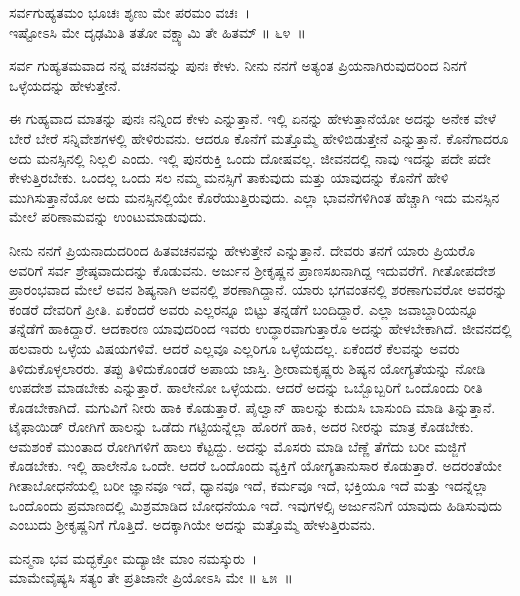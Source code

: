 \begin{shloka}
ಸರ್ವಗುಹ್ಯತಮಂ ಭೂಚಃ ಶೃಣು ಮೇ ಪರಮಂ ವಚಃ~।\\ಇಷ್ಟೋಽಸಿ ಮೇ ದೃಢಮಿತಿ ತತೋ ವಕ್ಷ್ಯಾಮಿ ತೇ ಹಿತಮ್ \hfill॥ ೬೪~॥
\end{shloka}

\begin{artha}
ಸರ್ವ ಗುಹ್ಯತಮವಾದ ನನ್ನ ವಚನವನ್ನು ಪುನಃ ಕೇಳು. ನೀನು ನನಗೆ ಅತ್ಯಂತ ಪ್ರಿಯನಾಗಿರುವುದರಿಂದ ನಿನಗೆ ಒಳ್ಳೆಯದನ್ನು ಹೇಳುತ್ತೇನೆ.
\end{artha}

ಈ ಗುಹ್ಯವಾದ ಮಾತನ್ನು ಪುನಃ ನನ್ನಿಂದ ಕೇಳು ಎನ್ನುತ್ತಾನೆ. ಇಲ್ಲಿ ಏನನ್ನು ಹೇಳುತ್ತಾನೆಯೋ ಅದನ್ನು ಅನೇಕ ವೇಳೆ ಬೇರೆ ಬೇರೆ ಸನ್ನಿವೇಶಗಳಲ್ಲಿ ಹೇಳಿರುವನು. ಆದರೂ ಕೊನೆಗೆ ಮತ್ತೊಮ್ಮೆ ಹೇಳಿಬಿಡುತ್ತೇನೆ ಎನ್ನುತ್ತಾನೆ. ಕೊನೆಗಾದರೂ ಅದು ಮನಸ್ಸಿನಲ್ಲಿ ನಿಲ್ಲಲಿ ಎಂದು. ಇಲ್ಲಿ ಪುನರುಕ್ತಿ ಒಂದು ದೋಷವಲ್ಲ. ಜೀವನದಲ್ಲಿ ನಾವು ಇದನ್ನು ಪದೇ ಪದೇ ಕೇಳುತ್ತಿರಬೇಕು. ಒಂದಲ್ಲ ಒಂದು ಸಲ ನಮ್ಮ ಮನಸ್ಸಿಗೆ ತಾಕುವುದು ಮತ್ತು ಯಾವುದನ್ನು ಕೊನೆಗೆ ಹೇಳಿ ಮುಗಿಸುತ್ತಾನೆಯೋ ಅದು ಮನಸ್ಸಿನಲ್ಲಿಯೇ ಕೊರೆಯುತ್ತಿರುವುದು. ಎಲ್ಲಾ ಭಾವನೆಗಳಿಗಿಂತ ಹೆಚ್ಚಾಗಿ ಇದು ಮನಸ್ಸಿನ ಮೇಲೆ ಪರಿಣಾಮವನ್ನು ಉಂಟುಮಾಡುವುದು.

ನೀನು ನನಗೆ ಪ್ರಿಯನಾದುದರಿಂದ ಹಿತವಚನವನ್ನು ಹೇಳುತ್ತೇನೆ ಎನ್ನುತ್ತಾನೆ. ದೇವರು ತನಗೆ ಯಾರು ಪ್ರಿಯರೊ ಅವರಿಗೆ ಸರ್ವ ಶ್ರೇಷ್ಠವಾದುದನ್ನು ಕೊಡುವನು. ಅರ್ಜುನ ಶ‍್ರೀಕೃಷ್ಣನ ಪ್ರಾಣಸಖನಾಗಿದ್ದ ಇದುವರೆಗೆ. ಗೀತೋಪದೇಶ ಪ್ರಾರಂಭವಾದ ಮೇಲೆ ಅವನ ಶಿಷ್ಯನಾಗಿ ಅವನಲ್ಲಿ ಶರಣಾಗಿದ್ದಾನೆ. ಯಾರು ಭಗವಂತನಲ್ಲಿ ಶರಣಾಗುವರೋ ಅವರನ್ನು ಕಂಡರೆ ದೇವರಿಗೆ ಪ್ರೀತಿ. ಏಕೆಂದರೆ ಅವರು ಎಲ್ಲರನ್ನೂ ಬಿಟ್ಟು ತನ್ನಡೆಗೆ ಬಂದಿದ್ದಾರೆ. ಎಲ್ಲಾ ಜವಾಬ್ದಾರಿಯನ್ನೂ ತನ್ನೆಡೆಗೆ ಹಾಕಿದ್ದಾರೆ. ಆದಕಾರಣ ಯಾವುದರಿಂದ ಇವರು ಉದ್ಧಾರವಾಗುತ್ತಾರೊ ಅದನ್ನು ಹೇಳಬೇಕಾಗಿದೆ. ಜೀವನದಲ್ಲಿ ಹಲವಾರು ಒಳ್ಳೆಯ ವಿಷಯಗಳಿವೆ. ಆದರೆ ಎಲ್ಲವೂ ಎಲ್ಲರಿಗೂ ಒಳ್ಳೆಯದಲ್ಲ. ಏಕೆಂದರೆ ಕೆಲವನ್ನು ಅವರು ತಿಳಿದುಕೊಳ್ಳಲಾರರು. ತಪ್ಪು ತಿಳಿದುಕೊಂಡರೆ ಅಪಾಯ ಜಾಸ್ತಿ. ಶ‍್ರೀರಾಮಕೃಷ್ಣರು ಶಿಷ್ಯನ ಯೋಗ್ಯತೆಯನ್ನು ನೋಡಿ ಉಪದೇಶ ಮಾಡಬೇಕು ಎನ್ನುತ್ತಾರೆ. ಹಾಲೇನೋ ಒಳ್ಳೆಯದು. ಆದರೆ ಅದನ್ನು ಒಬ್ಬೊಬ್ಬರಿಗೆ ಒಂದೊಂದು ರೀತಿ ಕೊಡಬೇಕಾಗಿದೆ. ಮಗುವಿಗೆ ನೀರು ಹಾಕಿ ಕೊಡುತ್ತಾರೆ. ಪೈಲ್ವಾನ್ ಹಾಲನ್ನು ಕುದುಸಿ ಬಾಸುಂದಿ ಮಾಡಿ ತಿನ್ನುತ್ತಾನೆ. ಟೈಫಾಯಿಡ್ ರೋಗಿಗೆ ಹಾಲನ್ನು ಒಡೆದು ಗಟ್ಟಿಯನ್ನೆಲ್ಲಾ ಹೊರಗೆ ಹಾಕಿ, ಅದರ ನೀರನ್ನು ಮಾತ್ರ ಕೊಡಬೇಕು. ಆಮಶಂಕೆ ಮುಂತಾದ ರೋಗಿಗಳಿಗೆ ಹಾಲು ಕೆಟ್ಟದ್ದು. ಅದನ್ನು ಮೊಸರು ಮಾಡಿ ಬೆಣ್ಣೆ ತೆಗೆದು ಬರೀ ಮಜ್ಜಿಗೆ ಕೊಡಬೇಕು. ಇಲ್ಲಿ ಹಾಲೇನೊ ಒಂದೇ. ಆದರೆ ಒಂದೊಂದು ವ್ಯಕ್ತಿಗೆ ಯೋಗ್ಯತಾನುಸಾರ ಕೊಡುತ್ತಾರೆ. ಅದರಂತೆಯೇ ಗೀತಾಬೋಧನೆಯಲ್ಲಿ ಬರೀ ಜ್ಞಾನವೂ ಇದೆ, ಧ್ಯಾನವೂ ಇದೆ, ಕರ್ಮವೂ ಇದೆ, ಭಕ್ತಿಯೂ ಇದೆ ಮತ್ತು ಇದನ್ನೆಲ್ಲಾ ಒಂದೊಂದು ಪ್ರಮಾಣದಲ್ಲಿ ಮಿಶ್ರಮಾಡಿದ ಬೋಧನೆಯೂ ಇದೆ. ಇವುಗಳಲ್ಸಿ ಅರ್ಜುನನಿಗೆ ಯಾವುದು ಹಿಡಿಸುವುದು ಎಂಬುದು ಶ‍್ರೀಕೃಷ್ಣನಿಗೆ ಗೊತ್ತಿದೆ. ಅದಕ್ಕಾಗಿಯೇ ಅದನ್ನು ಮತ್ತೊಮ್ಮೆ ಹೇಳುತ್ತಿರುವನು.

\begin{shloka}
ಮನ್ಮನಾ ಭವ ಮದ್ಭಕ್ತೋ ಮದ್ಯಾಜೀ ಮಾಂ ನಮಸ್ಕುರು~।\\ಮಾಮೇವೈಷ್ಯಸಿ ಸತ್ಯಂ ತೇ ಪ್ರತಿಜಾನೇ ಪ್ರಿಯೋಽಸಿ ಮೇ \hfill॥ ೬೫~॥
\end{shloka}


